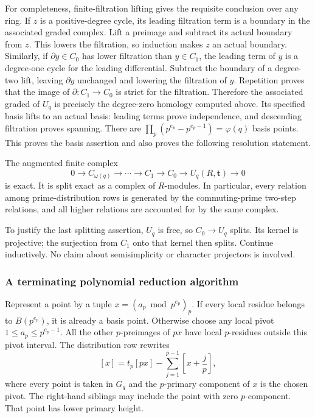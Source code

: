 For completeness, finite-filtration lifting gives the requisite
conclusion over any ring. If $z$ is a positive-degree cycle, its leading
filtration term is a boundary in the associated graded complex. Lift a
preimage and subtract its actual boundary from $z$. This lowers the
filtration, so induction makes $z$ an actual boundary. Similarly, if
$\partial y\in C_0$ has lower filtration than $y\in C_1$, the leading
term of $y$ is a degree-one cycle for the leading differential. Subtract
the boundary of a degree-two lift, leaving $\partial y$ unchanged and
lowering the filtration of $y$. Repetition proves that the image of
$\partial:C_1\to C_0$ is strict for the filtration. Therefore the
associated graded of $U_q$ is precisely the degree-zero homology
computed above. Its specified basis lifts to an actual basis: leading
terms prove independence, and descending filtration proves spanning.
There are
$\prod_p(p^{e_p}-p^{e_p-1})=\varphi(q)$ basis points. This proves the
basis assertion and also proves the following resolution statement.

\begin{corollary}
\label{intdist:cor:resolution}
The augmented finite complex
\[
 0\longrightarrow C_{\omega(q)}\longrightarrow\cdots
 \longrightarrow C_1\longrightarrow C_0
 \longrightarrow U_q(R,\mathbf t)\longrightarrow0
\]
is exact. It is split exact as a complex of $R$-modules. In particular,
every relation among prime-distribution rows is generated by the
commuting-prime two-step relations, and all higher relations are
accounted for by the same complex.
\end{corollary}

To justify the last splitting assertion, $U_q$ is free, so
$C_0\to U_q$ splits. Its kernel is projective; the surjection from
$C_1$ onto that kernel then splits. Continue inductively. No claim about
semisimplicity or character projectors is involved.

\subsubsection{A terminating polynomial reduction algorithm}

Represent a point by a tuple $x=(a_p\bmod p^{e_p})_p$. If every local
residue belongs to $B(p^{e_p})$, it is already a basis point. Otherwise
choose any local pivot $1\le a_p\le p^{e_p-1}$. All the other
$p$-preimages of $p x$ have local $p$-residues outside this pivot
interval. The distribution row rewrites
\begin{equation}\label{intdist:eq:rewrite}
 [x]=t_p[p x]-
 \sum_{j=1}^{p-1}
 \left[x+\frac{j}{p}\right],
\end{equation}
where every point is taken in $G_q$ and the $p$-primary component of
$x$ is the chosen pivot. The right-hand siblings may include the point
with zero $p$-component. That point has lower primary height.

